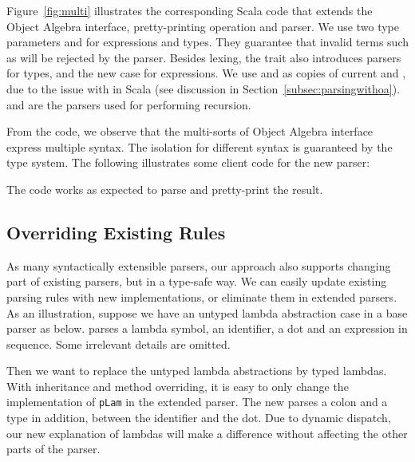 Figure~\ref{fig:multi} illustrates the corresponding Scala code
that extends the Object Algebra interface, pretty-printing operation and parser. We use two type parameters  and  for expressions and types. They guarantee that invalid terms such as  will be rejected by the parser.
Besides lexing, the trait  also introduces parsers for types, and the new case for expressions.
We use  and  as copies of current  and , due to the issue
with  in Scala (see discussion in Section~\ref{subsec:parsingwithoa}).  and  are the parsers used for performing recursion.

From the code, we observe that the multi-sorts of Object Algebra interface
express multiple syntax. The isolation for different syntax
is guaranteed by the type system. The following illustrates some client code
for the new parser:

The code works as expected to parse and pretty-print the result.

\subsection{Overriding Existing Rules}

As many syntactically extensible parsers, our approach also supports changing part of existing parsers, but in a type-safe way. We can easily update existing parsing rules with new implementations, or eliminate them in extended parsers. As an illustration, suppose we have an untyped lambda abstraction case in a base parser as below.  parses a lambda symbol, an identifier, a dot and an expression in sequence. Some irrelevant details are omitted.


Then we want to replace the untyped lambda abstractions by typed lambdas. With inheritance and method overriding, it is easy to only change the implementation of \lstinline{pLam} in the extended parser. The new  parses a colon and a type in addition, between the identifier and the dot. Due to dynamic dispatch, our new explanation of lambdas will make a difference without affecting the other parts of the parser.

